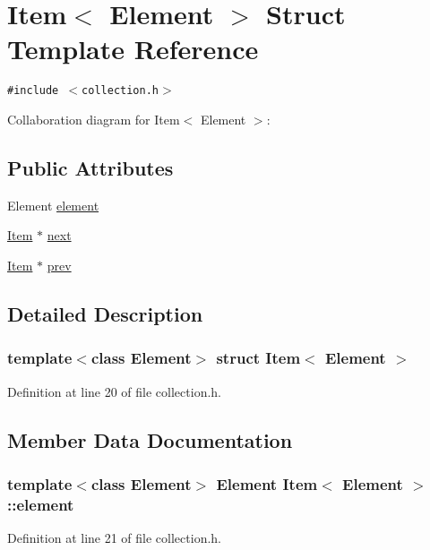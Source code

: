 \hypertarget{structItem}{
\section{Item$<$ Element $>$ Struct Template Reference}
\label{structItem}
}
{\tt \#include $<$collection.h$>$}

Collaboration diagram for Item$<$ Element $>$:\subsection*{Public Attributes}
\begin{CompactItemize}
\item 
Element \hyperlink{structItem_512add4d9ad8c37d697bde29849e7567}{element}
\item 
\hyperlink{structItem}{Item} $\ast$ \hyperlink{structItem_d71a5dc5b6a7540dd2bcda1f7764f000}{next}
\item 
\hyperlink{structItem}{Item} $\ast$ \hyperlink{structItem_37e220e71e790749d0d61993d7e9524f}{prev}
\end{CompactItemize}


\subsection{Detailed Description}
\subsubsection*{template$<$class Element$>$ struct Item$<$ Element $>$}



Definition at line 20 of file collection.h.

\subsection{Member Data Documentation}
\hypertarget{structItem_512add4d9ad8c37d697bde29849e7567}{
\subsubsection[{element}]{\setlength{\rightskip}{0pt plus 5cm}template$<$class Element$>$ Element {\bf Item}$<$ Element $>$::{\bf element}}}
\label{structItem_512add4d9ad8c37d697bde29849e7567}




Definition at line 21 of file collection.h.

